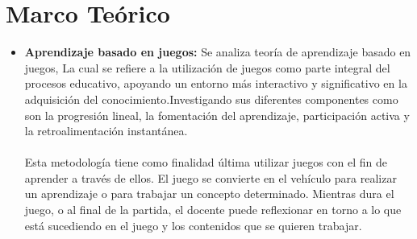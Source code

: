 \section{Marco Teórico}
\begin{itemize}
    \item \textbf{Aprendizaje basado en juegos:} Se analiza teoría de aprendizaje basado en juegos, La cual se refiere a la utilización de juegos como parte integral del procesos educativo, apoyando un entorno más interactivo y significativo en la adquisición del conocimiento.Investigando sus diferentes componentes como son la progresión lineal, la fomentación del aprendizaje, participación activa y la retroalimentación instantánea.
    \\ \\
Esta metodología tiene como finalidad última utilizar juegos con el fin de aprender a través de ellos. El juego se convierte en el vehículo para realizar un aprendizaje o para trabajar un concepto determinado. Mientras dura el juego, o al final de la partida, el docente puede reflexionar en torno a lo que está sucediendo en el juego y los contenidos que se quieren trabajar.\cite{f}

\end{itemize}

